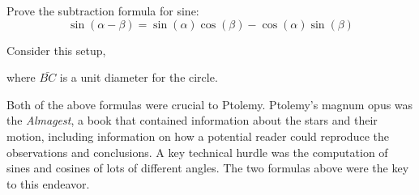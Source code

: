 \documentclass[newpage,hints,handout]{ximera}
\begin{document}
\begin{problem}
Prove the subtraction formula for sine:
\[
\sin(\alpha - \beta) = \sin(\alpha)\cos(\beta) -
\cos(\alpha)\sin(\beta)
\]
\begin{hint}
Consider this setup, 
\begin{image}
\end{image}
where $\bar{BC}$ is a unit diameter for the circle.
\end{hint}
\end{problem}

Both of the above formulas were crucial to Ptolemy.  Ptolemy's magnum opus was
the \textit{Almagest}, a book that contained information about the
stars and their motion, including information on how a potential
reader could reproduce the observations and conclusions. A key
technical hurdle was the computation of
sines and cosines of lots of different angles. The two formulas above were the
key to this endeavor.




\end{document}
